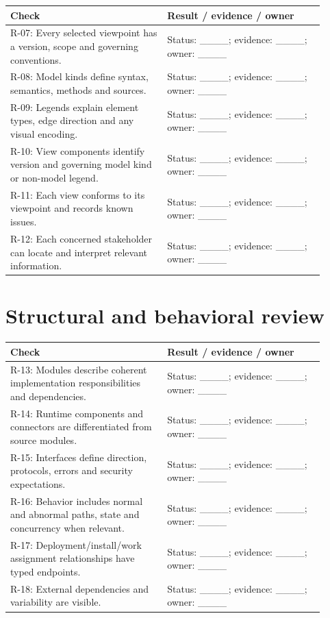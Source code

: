 \documentclass[11pt,letterpaper]{article}
\newcommand{\docsection}[1]{\Needspace{5\baselineskip}\section{#1}}
\begin{document}
\begin{longtable}{@{}>{\RaggedRight\arraybackslash}p{0.457\linewidth}>{\RaggedRight\arraybackslash}p{0.457\linewidth}@{}}
\toprule
\textbf{Check} & \textbf{Result / evidence / owner}\\\midrule
\endhead
R-07: Every selected viewpoint has a version, scope and governing conventions. & 
Status: \_\_\_\_; evidence: \_\_\_\_; owner: \_\_\_\_\\
R-08: Model kinds define syntax, semantics, methods and sources. & 
Status: \_\_\_\_; evidence: \_\_\_\_; owner: \_\_\_\_\\
R-09: Legends explain element types, edge direction and any visual encoding. & 
Status: \_\_\_\_; evidence: \_\_\_\_; owner: \_\_\_\_\\
R-10: View components identify version and governing model kind or non-model legend. & 
Status: \_\_\_\_; evidence: \_\_\_\_; owner: \_\_\_\_\\
R-11: Each view conforms to its viewpoint and records known issues. & 
Status: \_\_\_\_; evidence: \_\_\_\_; owner: \_\_\_\_\\
R-12: Each concerned stakeholder can locate and interpret relevant information. & 
Status: \_\_\_\_; evidence: \_\_\_\_; owner: \_\_\_\_\\
\bottomrule
\end{longtable}
\docsection{Structural and behavioral review}
\begin{longtable}{@{}>{\RaggedRight\arraybackslash}p{0.457\linewidth}>{\RaggedRight\arraybackslash}p{0.457\linewidth}@{}}
\toprule
\textbf{Check} & \textbf{Result / evidence / owner}\\\midrule
\endhead
R-13: Modules describe coherent implementation responsibilities and dependencies. & 
Status: \_\_\_\_; evidence: \_\_\_\_; owner: \_\_\_\_\\
R-14: Runtime components and connectors are differentiated from source modules. & 
Status: \_\_\_\_; evidence: \_\_\_\_; owner: \_\_\_\_\\
R-15: Interfaces define direction, protocols, errors and security expectations. & 
Status: \_\_\_\_; evidence: \_\_\_\_; owner: \_\_\_\_\\
R-16: Behavior includes normal and abnormal paths, state and concurrency when relevant. & 
Status: \_\_\_\_; evidence: \_\_\_\_; owner: \_\_\_\_\\
R-17: Deployment/install/work assignment relationships have typed endpoints. & 
Status: \_\_\_\_; evidence: \_\_\_\_; owner: \_\_\_\_\\
R-18: External dependencies and variability are visible. & 
Status: \_\_\_\_; evidence: \_\_\_\_; owner: \_\_\_\_\\
\bottomrule
\end{longtable}
\end{document}
